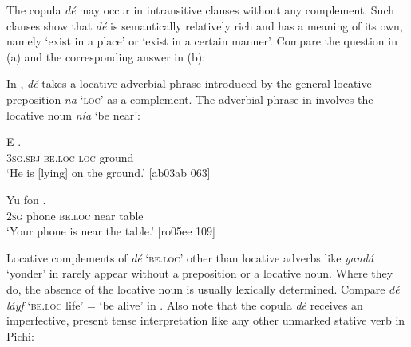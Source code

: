 The copula \textit{dé} may occur in intransitive clauses without any complement. Such clauses show that \textit{dé} is semantically relatively rich and has a meaning of its own, namely ‘exist in a place’ or ‘exist in a certain manner’. Compare the question in (a) and the corresponding answer in (b):



\ea%
    \label{ex:key:779}
\z\z

In , \textit{dé} takes a locative adverbial phrase introduced by the general locative preposition \textit{na} ‘\textsc{loc}’ as a complement. The adverbial phrase in  involves the locative noun \textit{nía} ‘be near’:


\ea%
    \label{ex:key:780}
    \gll E          .\\
\textsc{3sg.sbj}  \textsc{be.loc}  \textsc{loc}  ground\\

\glt ‘He is [lying] on the ground.’ [ab03ab 063]
\z


\ea%
    \label{ex:key:781}
    \gll Yu  fon            .\\
\textsc{2sg}  phone  \textsc{be.loc}  near    table\\

\glt ‘Your phone is near the table.’ [ro05ee 109]
\z

Locative complements of \textit{dé} ‘\textsc{be.loc}’ other than locative adverbs like \textit{yandá} ‘yonder’ in  rarely appear without a preposition or a locative noun. Where they do, the absence of the locative noun is usually lexically determined. Compare \textit{dé láyf} ‘\textsc{be.loc} life’ = ‘be alive’ in . Also note that the copula \textit{dé} receives an imperfective, present tense interpretation like any other unmarked stative verb in Pichi:


